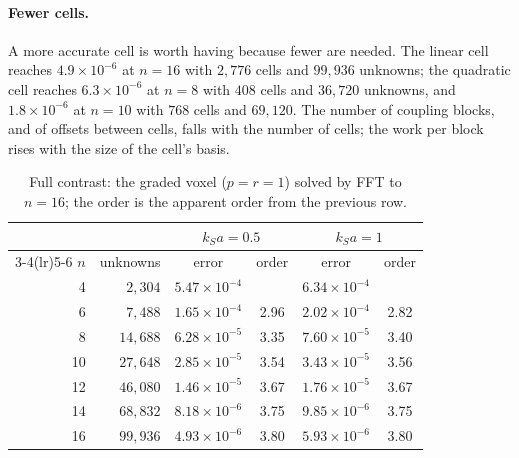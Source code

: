 \documentclass[11pt,a4paper]{article}
\begin{document}
\paragraph{Fewer cells.} A more accurate cell is worth having because fewer are needed. The linear cell
reaches $4.9\times10^{-6}$ at $n=16$ with $2{,}776$ cells and $99{,}936$ unknowns; the quadratic cell
reaches $6.3\times10^{-6}$ at $n=8$ with $408$ cells and $36{,}720$ unknowns, and $1.8\times10^{-6}$ at
$n=10$ with $768$ cells and $69{,}120$. The number of coupling blocks, and of offsets between cells, falls
with the number of cells; the work per block rises with the size of the cell's basis.

\begin{table}[ht]
\centering\small
\setlength{\tabcolsep}{6pt}
\begin{tabular}{@{}rrcccc@{}}
\toprule
 & & \multicolumn{2}{c}{$k_Sa=0.5$} & \multicolumn{2}{c}{$k_Sa=1$} \\
\cmidrule(lr){3-4}\cmidrule(lr){5-6}
$n$ & unknowns & error & order & error & order \\
\midrule
4 & $2{,}304$ & $5.47\times10^{-4}$ & & $6.34\times10^{-4}$ & \\
6 & $7{,}488$ & $1.65\times10^{-4}$ & 2.96 & $2.02\times10^{-4}$ & 2.82 \\
8 & $14{,}688$ & $6.28\times10^{-5}$ & 3.35 & $7.60\times10^{-5}$ & 3.40 \\
10 & $27{,}648$ & $2.85\times10^{-5}$ & 3.54 & $3.43\times10^{-5}$ & 3.56 \\
12 & $46{,}080$ & $1.46\times10^{-5}$ & 3.67 & $1.76\times10^{-5}$ & 3.67 \\
14 & $68{,}832$ & $8.18\times10^{-6}$ & 3.75 & $9.85\times10^{-6}$ & 3.75 \\
16 & $99{,}936$ & $4.93\times10^{-6}$ & 3.80 & $5.93\times10^{-6}$ & 3.80 \\
\bottomrule
\end{tabular}
\caption{Full contrast: the graded voxel ($p=r=1$) solved by FFT to $n=16$; the order is the apparent
order from the previous row.}\label{tab:fft}
\end{table}
\end{document}
